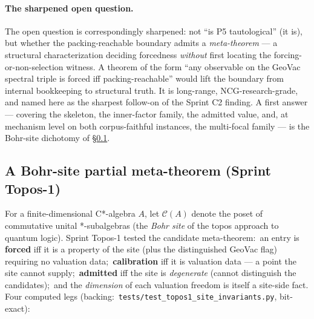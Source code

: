\documentclass[11pt,a4paper]{article}
\theoremstyle{plain}
\theoremstyle{definition}
\begin{document}
\paragraph{The sharpened open question.} The open question is correspondingly sharpened:  not ``is P5 tautological'' (it is), but whether the packing-reachable boundary admits a \emph{meta-theorem} --- a structural characterization deciding forcedness \emph{without} first locating the forcing-or-non-selection witness.  A theorem of the form ``any observable on the GeoVac spectral triple is forced iff packing-reachable'' would lift the boundary from internal bookkeeping to structural truth.  It is long-range, NCG-research-grade, and named here as the sharpest follow-on of the Sprint C2 finding.  A first answer --- covering the skeleton, the inner-factor family, the admitted value, and, at mechanism level on both corpus-faithful instances, the multi-focal family --- is the Bohr-site dichotomy of \S\ref{sec:open_bohr}.

\subsection{A Bohr-site partial meta-theorem (Sprint Topos-1)}
\label{sec:open_bohr}

For a finite-dimensional C*-algebra $A$, let $\mathcal{C}(A)$ denote the
poset of commutative unital *-subalgebras (the \emph{Bohr site} of the
topos approach to quantum logic).  Sprint Topos-1 tested the candidate
meta-theorem:\ an entry is \textbf{forced} iff it is a property of the
site (plus the distinguished GeoVac flag) requiring no valuation data;\
\textbf{calibration} iff it is valuation data --- a point the site
cannot supply;\ \textbf{admitted} iff the site is \emph{degenerate}
(cannot distinguish the candidates);\ and the \emph{dimension} of each
valuation freedom is itself a site-side fact.  Four computed legs
(backing:\ \texttt{tests/test\_topos1\_site\_invariants.py}, bit-exact):
\end{document}
